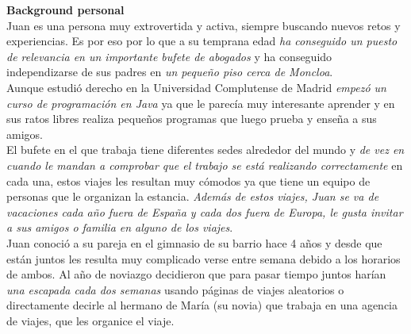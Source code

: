 \textbf{Background personal} \\

Juan es una persona muy extrovertida y activa, siempre buscando nuevos retos y experiencias. Es por eso por lo que a su temprana edad \textit{ha conseguido un puesto de relevancia en un importante bufete de abogados} y ha conseguido independizarse de sus padres en \textit{un pequeño piso cerca de Moncloa}. \\

Aunque estudió derecho en la Universidad Complutense de Madrid \textit{empezó un curso de programación en Java} ya que le parecía muy interesante aprender y en sus ratos libres realiza pequeños programas que luego prueba y enseña a sus amigos. \\

El bufete en el que trabaja tiene diferentes sedes alrededor del mundo y \textit{de vez en cuando le mandan a comprobar que el trabajo se está realizando correctamente} en cada una, estos viajes les resultan muy cómodos ya que tiene un equipo de personas que le organizan la estancia. \textit{Además de estos viajes, Juan se va de vacaciones cada año fuera de España y cada dos fuera de Europa, le gusta invitar a sus amigos o familia en alguno de los viajes}. \\

Juan conoció a su pareja en el gimnasio de su barrio hace 4 años y desde que están juntos les resulta muy complicado verse entre semana debido a los horarios de ambos. Al año de noviazgo decidieron que para pasar tiempo juntos harían \textit{una escapada cada dos semanas} usando páginas de viajes aleatorios o directamente decirle al hermano de María (su novia) que trabaja en una agencia de viajes, que les organice el viaje.

